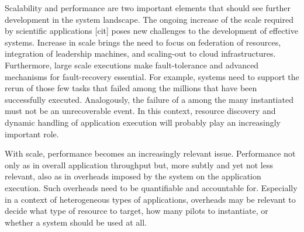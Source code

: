 \documentclass{sig-alternate}
\begin{document}
Scalability and performance are two important elements that should see further
development in the \pilot system landscape. The ongoing increase of the scale
required by scientific applications [cit] poses new challenges to the
development of effective \pilot systems. Increase in scale brings the need to
focus on federation of resources, integration of leadership machines, and
scaling-out to cloud infrastructures. Furthermore, large scale executions make
fault-tolerance and advanced mechanisms for fault-recovery essential. For
example, \pilot systems need to support the rerun of those few tasks that failed
among the millions that have been successfully executed.  Analogously, the failure of a \pilot among the many
instantiated must not be an unrecoverable event. In this context, resource
discovery and dynamic handling of application execution will probably play an
increasingly important role.

With scale, performance becomes an increasingly relevant issue. Performance not
only as in overall application throughput but, more subtly and yet not less
relevant, also as in overheads imposed by the \pilot system on the application
execution. Such overheads need to be quantifiable and accountable for.
Especially in a context of heterogeneous types of applications, \pilot overheads
may be relevant to decide what type of resource to target, how many pilots to
instantiate, or whether a \pilot system should be used at all.

\end{document}
